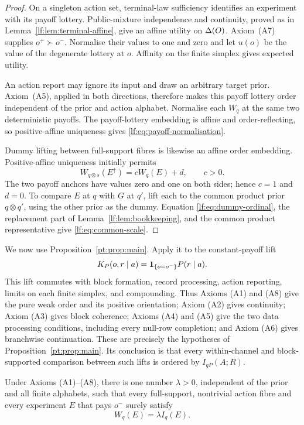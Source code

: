 \begin{proof}
On a singleton action set, terminal-law sufficiency identifies an experiment
with its payoff lottery.  Public-mixture independence and continuity, proved as
in Lemma~\ref{lf:lem:terminal-affine}, give an affine utility on $\Delta(O)$.
Axiom~\textup{(A7)} supplies $o^+\succ o^-$.  Normalise their values to one
and zero and let $u(o)$ be the value of the degenerate lottery at $o$.
Affinity on the finite simplex gives expected utility.

An action report may ignore its input and draw an arbitrary target prior.
Axiom~\textup{(A5)}, applied in both directions, therefore makes this payoff
lottery order independent of the prior and action alphabet.  Normalise each
$W_q$ at the same two deterministic payoffs.  The payoff-lottery embedding is
affine and order-reflecting, so positive-affine uniqueness gives
\eqref{lf:eq:payoff-normalisation}.

Dummy lifting between full-support fibres is likewise an affine order
embedding.  Positive-affine uniqueness initially permits
\[
W_{q\otimes s}(E^\uparrow)=cW_q(E)+d,
\qquad c>0.
\]
The two payoff anchors have values zero and one on both sides; hence $c=1$ and
$d=0$.  To compare $E$ at $q$ with $G$ at $q'$, lift each to the common product
prior $q\otimes q'$, using the other prior as the dummy.  Equation
\eqref{lf:eq:dummy-ordinal}, the replacement part of
Lemma~\ref{lf:lem:bookkeeping}, and the common product representative give
\eqref{lf:eq:common-scale}.
\end{proof}

We now use Proposition~\ref{pt:prop:main}.  Apply it to the
constant-payoff lift
\[
K_P(o,r\mid a)=\mathbf 1_{\{o=o^-\}}P(r\mid a).
\]
This lift commutes with block formation, record processing, action reporting,
limits on each finite simplex, and compounding.  Thus Axioms
\textup{(A1)} and \textup{(A8)} give the pure weak order and its positive
orientation; Axiom \textup{(A2)} gives continuity; Axiom \textup{(A3)} gives
block coherence; Axioms \textup{(A4)} and \textup{(A5)} give the two data
processing conditions, including every null-row completion; and Axiom
\textup{(A6)} gives branchwise continuation.  These are precisely the
hypotheses of Proposition~\ref{pt:prop:main}.  Its conclusion is that every
within-channel and block-supported comparison between such lifts is ordered by
$I_{qP}(A;R)$.

\begin{lemma}\label{lf:lem:trace-scale}
Under Axioms \textup{(A1)--(A8)}, there is one number $\lambda>0$, independent
of the prior and all finite alphabets, such that every full-support,
nontrivial action fibre and every experiment $E$ that pays $o^-$ surely satisfy
\begin{equation}
W_q(E)=\lambda I_q(E).
\label{lf:eq:sure-low}
\end{equation}
\end{lemma}

